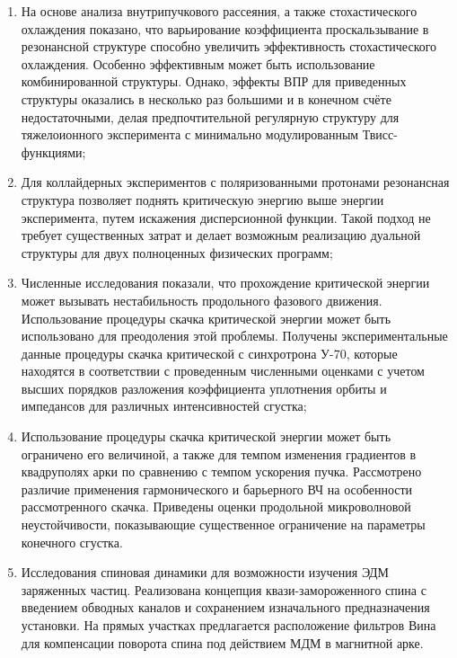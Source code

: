 \begin{enumerate}

  \item На основе анализа внутрипучкового рассеяния, а также стохастического охлаждения показано, что варьирование коэффициента проскальзывание в резонансной структуре способно увеличить эффективность стохастического охлаждения. Особенно эффективным может быть использование комбинированной структуры. Однако, эффекты ВПР для приведенных структуры оказались в несколько раз большими и в конечном счёте недостаточными, делая предпочтительной регулярную структуру для тяжелоионного эксперимента с минимально модулированным Твисс-функциями;
  
  \item Для коллайдерных экспериментов с поляризованными протонами резонансная структура позволяет поднять критическую энергию выше энергии эксперимента, путем искажения дисперсионной функции. Такой подход не требует существенных затрат и делает возможным реализацию дуальной структуры для двух полноценных физических программ;
  
  \item Численные исследования показали, что прохождение критической энергии может вызывать нестабильность продольного фазового движения. Использование процедуры скачка критической энергии может быть использовано для преодоления этой проблемы. Получены экспериментальные данные процедуры скачка критической с синхротрона У-70, которые находятся в соответствии с проведенным численными оценками с учетом высших порядков разложения коэффициента уплотнения орбиты и импедансов для различных интенсивностей сгустка;
  
  \item Использование процедуры скачка критической энергии может быть ограничено его величиной, а также для темпом изменения градиентов в квадруполях арки по сравнению с темпом ускорения пучка. Рассмотрено различие применения гармонического и барьерного ВЧ на особенности рассмотренного скачка. Приведены оценки продольной микроволновой неустойчивости, показывающие существенное ограничение на параметры конечного сгустка.
  
  \item Исследования спиновая динамики для возможности изучения ЭДМ заряженных частиц. Реализована концепция квази-замороженного спина с введением обводных каналов и сохранением изначального предназначения установки. На прямых участках предлагается расположение фильтров Вина для компенсации поворота спина под действием МДМ в магнитной арке.
  

\end{enumerate}
